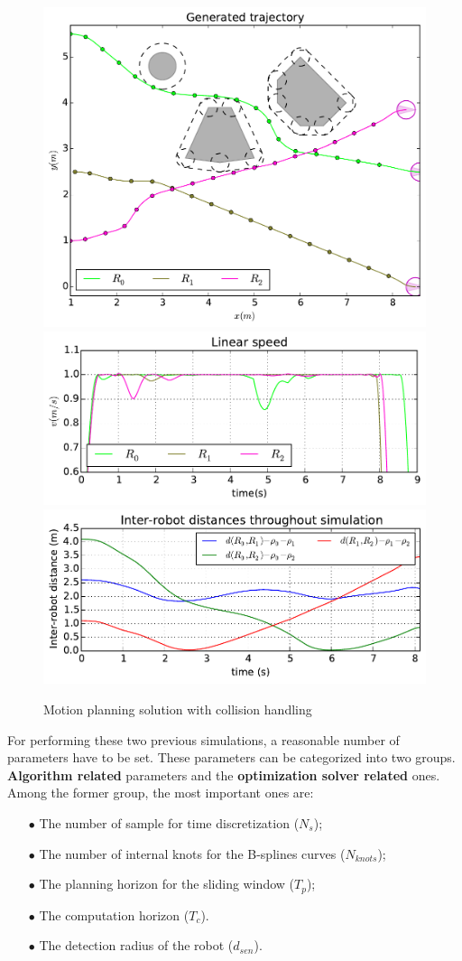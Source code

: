 \begin{figure}\centering
  \includegraphics[width=.45\linewidth]{./images/no_collision/new/multirobot-path.pdf} 
  \\[1mm]
  \includegraphics[width=.45\linewidth]{./images/no_collision/new/multirobot-vw.pdf} %
  \includegraphics[width=.45\linewidth]{./images/no_collision/new/multirobot-interr.pdf} %
  \caption{Motion planning solution with collision handling\label{fig:nocollision}}
\label{fig:res}
\end{figure}

For performing these two previous simulations, a reasonable number of parameters have to be set. These parameters can be categorized into two groups. \textbf{Algorithm related} parameters and the \textbf{optimization solver related} ones.
Among the former group, the most important ones are:
\begin{itemize}
\item[$\bullet$] The number of sample for time discretization ($N_s$);
\item[$\bullet$] The number of internal knots for the B-splines curves ($N_{knots}$);
\item[$\bullet$] The planning horizon for the sliding window ($T_p$);
\item[$\bullet$] The computation horizon ($T_c$).
\item[$\bullet$] The detection radius of the robot ($d_{sen}$).
\end{itemize}


